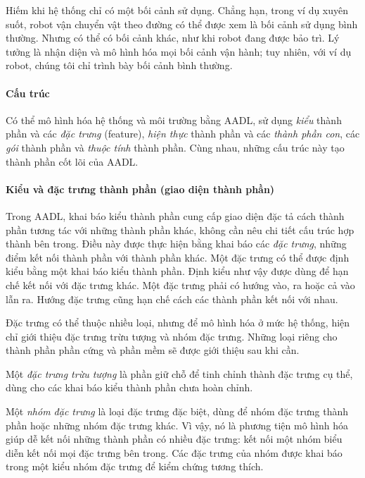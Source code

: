 Hiếm khi hệ thống chỉ có một bối cảnh sử dụng. Chẳng hạn, trong ví dụ xuyên suốt, robot vận chuyển vật theo đường có thể được xem là bối cảnh sử dụng bình thường. Nhưng có thể có bối cảnh khác, như khi robot đang được bảo trì. Lý tưởng là nhận diện và mô hình hóa mọi bối cảnh vận hành; tuy nhiên, với ví dụ robot, chúng tôi chỉ trình bày bối cảnh bình thường.

\paragraph*{Cấu trúc}
Có thể mô hình hóa hệ thống và môi trường bằng AADL, sử dụng \emph{kiểu} thành phần và các \emph{đặc trưng} (feature), \emph{hiện thực} thành phần và các \emph{thành phần con}, các \emph{gói} thành phần và \emph{thuộc tính} thành phần. Cùng nhau, những cấu trúc này tạo thành phần cốt lõi của AADL.

\paragraph*{Kiểu và đặc trưng thành phần (giao diện thành phần)}
Trong AADL, khai báo kiểu thành phần cung cấp giao diện đặc tả cách thành phần tương tác với những thành phần khác, không cần nêu chi tiết cấu trúc hợp thành bên trong. Điều này được thực hiện bằng khai báo các \emph{đặc trưng}, những điểm kết nối thành phần với thành phần khác. Một đặc trưng có thể được định kiểu bằng một khai báo kiểu thành phần. Định kiểu như vậy được dùng để hạn chế kết nối với đặc trưng khác. Một đặc trưng phải có hướng vào, ra hoặc cả vào lẫn ra. Hướng đặc trưng cũng hạn chế cách các thành phần kết nối với nhau.

Đặc trưng có thể thuộc nhiều loại, nhưng để mô hình hóa ở mức hệ thống, hiện chỉ giới thiệu đặc trưng trừu tượng và nhóm đặc trưng. Những loại riêng cho thành phần phần cứng và phần mềm sẽ được giới thiệu sau khi cần.

Một \emph{đặc trưng trừu tượng} là phần giữ chỗ để tinh chỉnh thành đặc trưng cụ thể, dùng cho các khai báo kiểu thành phần chưa hoàn chỉnh.

Một \emph{nhóm đặc trưng} là loại đặc trưng đặc biệt, dùng để nhóm đặc trưng thành phần hoặc những nhóm đặc trưng khác. Vì vậy, nó là phương tiện mô hình hóa giúp dễ kết nối những thành phần có nhiều đặc trưng: kết nối một nhóm biểu diễn kết nối mọi đặc trưng bên trong. Các đặc trưng của nhóm được khai báo trong một kiểu nhóm đặc trưng để kiểm chứng tương thích.

